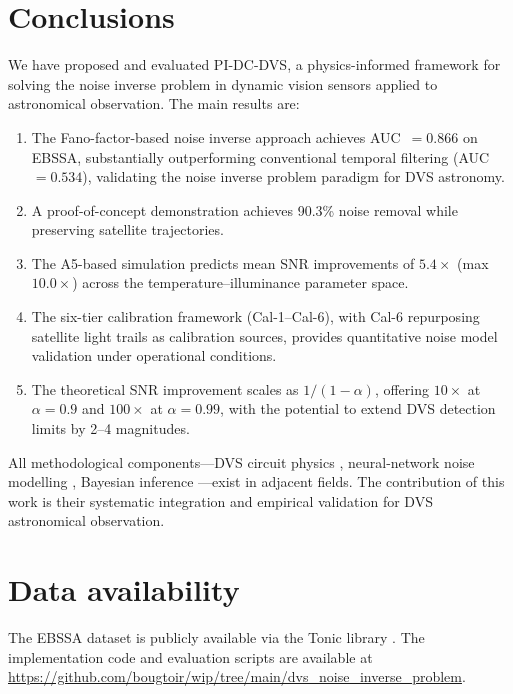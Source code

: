 \documentclass[twocolumn]{article}
\begin{document}
\section{Conclusions}
\label{sec:conclusion}

We have proposed and evaluated PI-DC-DVS, a physics-informed framework for solving the noise inverse problem in dynamic vision sensors applied to astronomical observation.
The main results are:

\begin{enumerate}
  \item The Fano-factor-based noise inverse approach achieves AUC~$= 0.866$ on EBSSA, substantially outperforming conventional temporal filtering (AUC~$= 0.534$), validating the noise inverse problem paradigm for DVS astronomy.
  \item A proof-of-concept demonstration achieves 90.3\% noise removal while preserving satellite trajectories.
  \item The A5-based simulation predicts mean SNR improvements of $5.4\times$ (max $10.0\times$) across the temperature--illuminance parameter space.
  \item The six-tier calibration framework (Cal-1--Cal-6), with Cal-6 repurposing satellite light trails as calibration sources, provides quantitative noise model validation under operational conditions.
  \item The theoretical SNR improvement scales as $1/(1-\alpha)$, offering $10\times$ at $\alpha = 0.9$ and $100\times$ at $\alpha = 0.99$, with the potential to extend DVS detection limits by 2--4 magnitudes.
\end{enumerate}

All methodological components---DVS circuit physics \citep{A5}, neural-network noise modelling \citep{D1}, Bayesian inference \citep{D7}---exist in adjacent fields.
The contribution of this work is their systematic integration and empirical validation for DVS astronomical observation.


\begin{acknowledgements}
\end{acknowledgements}

\section*{Data availability}
The EBSSA dataset is publicly available via the Tonic library \citep{C1}.
The implementation code and evaluation scripts are available at \url{https://github.com/bougtoir/wip/tree/main/dvs_noise_inverse_problem}.
\end{document}
